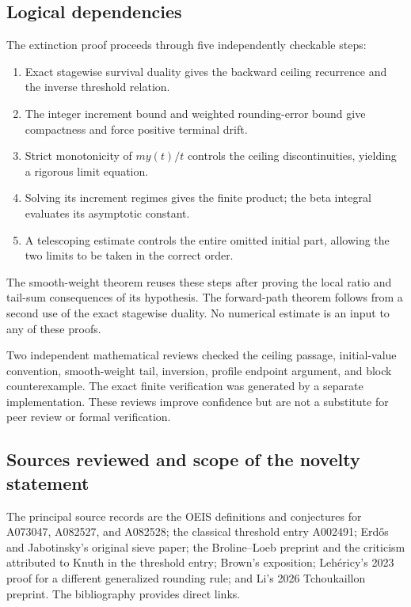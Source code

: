 \subsection{Logical dependencies}

The extinction proof proceeds through five independently checkable
steps:
\begin{enumerate}
\item Exact stagewise survival duality gives the backward ceiling
recurrence and the inverse threshold relation.
\item The integer increment bound and weighted rounding-error bound
give compactness and force positive terminal drift.
\item Strict monotonicity of $my(t)/t$ controls the ceiling
discontinuities, yielding a rigorous limit equation.
\item Solving its increment regimes gives the finite product;
the beta integral evaluates its asymptotic constant.
\item A telescoping estimate controls the entire omitted initial
part, allowing the two limits to be taken in the correct order.
\end{enumerate}
The smooth-weight theorem reuses these steps after proving the local
ratio and tail-sum consequences of its hypothesis. The forward-path
theorem follows from a second use of the exact stagewise duality.
No numerical estimate is an input to any of these proofs.

Two independent mathematical reviews checked the ceiling passage,
initial-value convention, smooth-weight tail, inversion, profile
endpoint argument, and block counterexample. The exact finite
verification was generated by a separate implementation. These
reviews improve confidence but are not a substitute for peer review
or formal verification.

\subsection{Sources reviewed and scope of the novelty statement}

The principal source records are the OEIS definitions and conjectures
for A073047, A082527, and A082528; the classical threshold entry
A002491; Erd\H{o}s and Jabotinsky's original sieve paper; the
Broline--Loeb preprint and the criticism attributed to Knuth in the
threshold entry; Brown's exposition; Leh\'ericy's 2023 proof for a
different generalized rounding rule; and Li's 2026 Tchoukaillon
preprint. The bibliography provides direct links.


